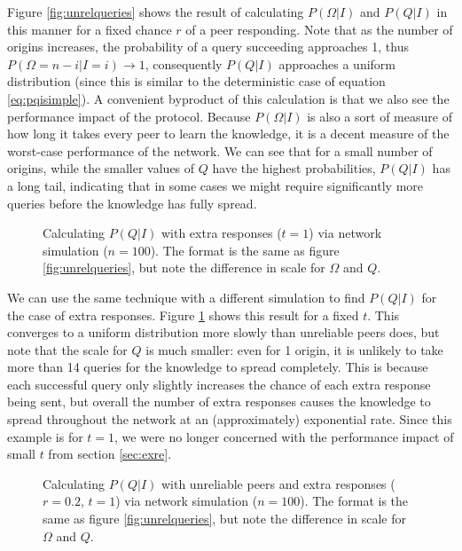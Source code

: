\documentclass{article}
\newcommand{\eqnref}[1]{equation \eqref{eq:#1}}
\newcommand{\secref}[1]{section \ref{sec:#1}}
\newcommand{\figref}[1]{figure \ref{fig:#1}}
\newcommand{\Figref}[1]{Figure \ref{fig:#1}}
\begin{document}
\Figref{unrelqueries} shows the result of
calculating $P(\Omega|I)$ and $P(Q|I)$ in this manner for a fixed chance $r$ of
a peer responding. Note that as the number of origins increases, the probability
of a query succeeding approaches 1, thus $P(\Omega=n-i|I=i)\rightarrow 1$,
consequently $P(Q|I)$ approaches a uniform distribution (since this is similar
to the deterministic case of \eqnref{pqisimple}). A convenient byproduct of this
calculation is that we also see the performance impact of the protocol.
Because $P(\Omega|I)$ is also a sort of measure of how long it takes every peer
to learn the knowledge, it is a decent measure of the worst-case performance of
the network. We can see that for a small number of origins, while the smaller
values of $Q$ have the highest probabilities, $P(Q|I)$ has a long tail,
indicating that in some cases we might require significantly more queries
before the knowledge has fully spread.

\begin{figure}%
    \centering
	\caption{Calculating $P(Q|I)$ with extra responses ($t=1$) via network
	simulation ($n=100$). The format is the same as \figref{unrelqueries}, but
	note the difference in scale for $\Omega$ and $Q$.}
    \label{fig:exrequeries}%
\end{figure}

We can use the same technique with a different simulation to find $P(Q|I)$ for
the case of extra responses. \Figref{exrequeries} shows this result for a fixed $t$.
This converges to a uniform distribution more slowly than unreliable peers does,
but note that the scale for $Q$ is much smaller: even for 1 origin, it is
unlikely to take more than 14 queries for the knowledge to spread completely.
This is because each successful query only slightly increases the chance of each
extra response being sent, but overall the number of extra responses causes the
knowledge to spread throughout the network at an (approximately) exponential
rate. Since this example is for $t=1$, we were no longer concerned with the
performance impact of small $t$ from \secref{exre}.

\begin{figure}%
    \centering
	\caption{Calculating $P(Q|I)$ with unreliable peers and extra responses
	($r=0.2$, $t=1$) via network simulation ($n=100$). The format is the same
	as \figref{unrelqueries}, but note the difference in scale for $\Omega$ and
	$Q$.}
    \label{fig:unexrequeries}%
\end{figure}
\end{document}
